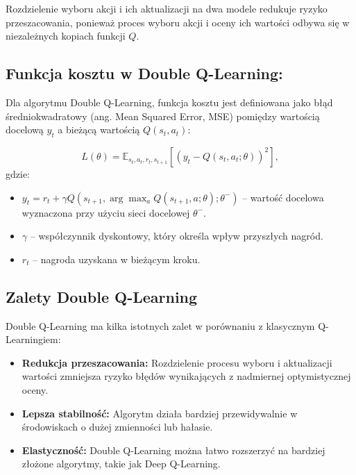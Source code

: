 Rozdzielenie wyboru akcji i ich aktualizacji na dwa modele redukuje ryzyko przeszacowania, ponieważ proces wyboru akcji i oceny ich wartości odbywa się w niezależnych kopiach funkcji \(Q\).

\subsection{Funkcja kosztu w Double Q-Learning:}

Dla algorytmu Double Q-Learning, funkcja kosztu jest definiowana jako błąd średniokwadratowy (ang. Mean Squared Error, MSE) pomiędzy wartością docelową \(y_t\) a bieżącą wartością \(Q(s_t, a_t)\):

\begin{equation}L(\theta) = \mathbb{E}_{s_t, a_t, r_t, s_{t+1}} \left[ \left( y_t - Q(s_t, a_t; \theta) \right)^2 \right],\end{equation}
gdzie:
\begin{itemize}
	\item \(y_t = r_t + \gamma Q(s_{t+1}, \arg\max_a Q(s_{t+1}, a; \theta); \theta^{-})\) – wartość docelowa wyznaczona przy użyciu sieci docelowej \(\theta^{-}\).
	\item \(\gamma\) – współczynnik dyskontowy, który określa wpływ przyszłych nagród.
	\item \(r_t\) – nagroda uzyskana w bieżącym kroku.
\end{itemize}

\subsection{Zalety Double Q-Learning}

Double Q-Learning ma kilka istotnych zalet w porównaniu z klasycznym Q-Learningiem:
\begin{itemize}
	\item \textbf{Redukcja przeszacowania:} Rozdzielenie procesu wyboru i aktualizacji wartości zmniejsza ryzyko błędów wynikających z nadmiernej optymistycznej oceny.
	\item \textbf{Lepsza stabilność:} Algorytm działa bardziej przewidywalnie w środowiskach o dużej zmienności lub hałasie.
	\item \textbf{Elastyczność:} Double Q-Learning można łatwo rozszerzyć na bardziej złożone algorytmy, takie jak Deep Q-Learning.
\end{itemize}
